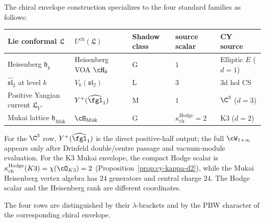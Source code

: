 \begin{proposition}
\label{prop:chiral-envelope-four-families}
The chiral envelope construction specializes to the four standard families as follows:
\begin{center}
\renewcommand{\arraystretch}{1.3}
\small
\begin{tabular}{lllll}
 \toprule
 \textbf{Lie conformal $\mathfrak{L}$} & $U^{\mathrm{ch}}(\mathfrak{L})$ & \textbf{Shadow class} & \textbf{source scalar} & \textbf{CY source} \\
 \midrule
 Heisenberg $\mathfrak{h}_k$ & Heisenberg VOA $\cH_k$ & G & $1$ & Elliptic $E$ ($d = 1$) \\
 $\widehat{\mathfrak{sl}}_2$ at level $k$ & $V_k(\mathfrak{sl}_2)$ & L & $3$ & 3d hol CS \\
 Positive Yangian current $\mathfrak{L}_{Y^+}$ & $Y^+(\widehat{\fgl}_1)$ & M & $1$ & $\C^3$ ($d = 3$) \\
 Mukai lattice $\mathfrak{h}_{\mathrm{Muk}}$ & $\cH_{\mathrm{Muk}}$ & G & $\kappa_{\mathrm{ch}}^{\mathrm{Hodge}}=2$ & K3 ($d = 2$) \\
 \bottomrule
\end{tabular}
\end{center}
For the $\C^3$ row, $Y^+(\widehat{\fgl}_1)$ is the direct positive-half output; the full $\cW_{1+\infty}$ appears only after Drinfeld double/centre passage and vacuum-module evaluation. For the K3 Mukai envelope, the compact Hodge scalar is \(\kappa_{\mathrm{ch}}^{\mathrm{Hodge}}(K3)=\chi(\cO_{K3})=2\) (Proposition~\textup{\ref{prop:cy-kappa-d2}}), while the Mukai Heisenberg vertex algebra has \(24\) generators and central charge \(24\). The Hodge scalar and the Heisenberg rank are different coordinates.

\smallskip
The four rows are distinguished by their \(\lambda\)-brackets and by the
PBW character of the corresponding chiral envelope.
\end{proposition}

